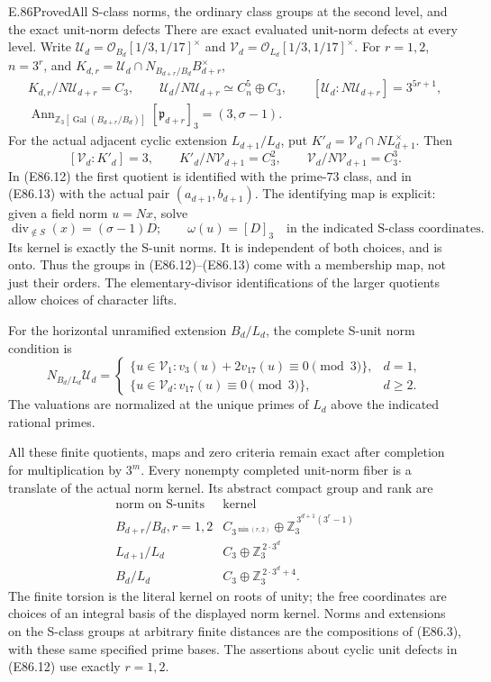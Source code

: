 \begin{statement}{E.86}{Proved}{All S-class norms, the ordinary class groups at the second level, and the exact unit-norm defects}
There are exact evaluated unit-norm defects at every level.
Write $\mathscr U_d=\mathcal O_{B_d}[1/3,1/17]^\times$
and $\mathscr V_d=\mathcal O_{L_d}[1/3,1/17]^\times$.
For $r=1,2$, $n=3^r$, and
$K_{d,r}=\mathscr U_d\cap N_{B_{d+r}/B_d}B_{d+r}^\times$,
\[
 \begin{gathered}
 K_{d,r}/N\mathscr U_{d+r}=C_3,\qquad
 \mathscr U_d/N\mathscr U_{d+r}\simeq C_n^5\oplus C_3,
 \qquad [\mathscr U_d:N\mathscr U_{d+r}]=3^{5r+1},\\
 \operatorname{Ann}_{\mathbb Z_3[\operatorname{Gal}(B_{d+r}/B_d)]}
                  [\mathfrak p_{d+r}]_3=(3,\sigma-1).
 \end{gathered}
 \tag{E86.12}
\]
For the actual adjacent cyclic extension $L_{d+1}/L_d$, put
$K'_d=\mathscr V_d\cap N L_{d+1}^\times$. Then
\[
 [\mathscr V_d:K'_d]=3,\qquad
 K'_d/N\mathscr V_{d+1}=C_3^2,\qquad
 \mathscr V_d/N\mathscr V_{d+1}=C_3^3.
 \tag{E86.13}
\]
In (E86.12) the first quotient is identified with the
prime-$73$ class, and in (E86.13) with the actual pair
$(a_{d+1},b_{d+1})$. The identifying map is explicit:
given a field norm $u=Nx$, solve
\[
 \operatorname{div}_{\notin S}(x)=(\sigma-1)D;
 \qquad \omega(u)=[D]_3
       \quad\text{in the indicated S-class coordinates}.
 \tag{E86.14}
\]
Its kernel is exactly the S-unit norms. It is independent
of both choices, and is onto. Thus the groups in
(E86.12)--(E86.13) come with a membership map, not just
their orders. The elementary-divisor identifications of
the larger quotients allow choices of character lifts.

For the horizontal unramified extension $B_d/L_d$, the
complete S-unit norm condition is
\[
 N_{B_d/L_d}\mathscr U_d
 =\begin{cases}
 \{u\in\mathscr V_1:v_3(u)+2v_{17}(u)\equiv0\pmod3\},&d=1,\\
 \{u\in\mathscr V_d:v_{17}(u)\equiv0\pmod3\},&d\ge2.
 \end{cases}
 \tag{E86.15}
\]
The valuations are normalized at the unique primes of
$L_d$ above the indicated rational primes.

All these finite quotients, maps and zero criteria remain
exact after completion for multiplication by $3^m$.
Every nonempty completed unit-norm fiber is a translate
of the actual norm kernel. Its abstract compact group
and rank are
\[
 \begin{array}{c|c}
 \text{norm on S-units}&\text{kernel}\\ \hline
 B_{d+r}/B_d, r=1,2&
 C_{3^{\min(r,2)}}\oplus
       \mathbb Z_3^{\,3^{d+1}(3^r-1)}\\
 L_{d+1}/L_d&C_3\oplus\mathbb Z_3^{\,2\cdot3^d}\\
 B_d/L_d&C_3\oplus\mathbb Z_3^{\,2\cdot3^d+4}.
 \end{array}
 \tag{E86.16}
\]
The finite torsion is the literal kernel on roots of unity;
the free coordinates are choices of an integral basis of
the displayed norm kernel. Norms and extensions on the
S-class groups at arbitrary finite distances are the
compositions of (E86.3), with these same specified prime
bases. The assertions about cyclic unit defects in
(E86.12) use exactly $r=1,2$.


\end{statement}
